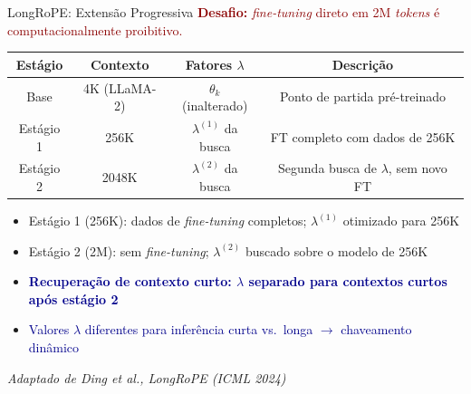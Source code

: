 \documentclass[aspectratio=169, xcolor=dvipsnames]{beamer}
\begin{document}
  \begin{frame}{LongRoPE: Extensão Progressiva}
    \textcolor{DarkRed}{\textbf{Desafio:} \textit{fine-tuning} direto em 2M \textit{tokens} é computacionalmente proibitivo.}

    \vspace{0.3em}
    \centering
    {\small
    \begin{tabular}{cccc}
      \toprule
      \textbf{Estágio} & \textbf{Contexto} & \textbf{Fatores $\lambda$} & \textbf{Descrição} \\
      \midrule
      Base    & 4K (LLaMA-2)  & $\theta_k$ (inalterado)      & Ponto de partida pré-treinado \\
      Estágio 1 & 256K        & $\lambda^{(1)}$ da busca     & FT completo com dados de 256K \\
      Estágio 2 & 2048K       & $\lambda^{(2)}$ da busca     & Segunda busca de $\lambda$, sem novo FT \\
      \bottomrule
    \end{tabular}}

    \flushleft
    \begin{itemize}
      \item Estágio 1 (256K): dados de \textit{fine-tuning} completos; $\lambda^{(1)}$ otimizado para 256K
      \item Estágio 2 (2M): sem \textit{fine-tuning}; $\lambda^{(2)}$ buscado sobre o modelo de 256K
      \item \textcolor{DarkBlue}{\textbf{Recuperação de contexto curto: $\lambda$ separado para contextos curtos após estágio 2}}
      \item \textcolor{DarkBlue}{Valores $\lambda$ diferentes para inferência curta vs.\ longa $\to$ chaveamento dinâmico}
    \end{itemize}

    {\scriptsize\textit{Adaptado de Ding et al., LongRoPE (ICML 2024)}}
  \end{frame}
\end{document}
